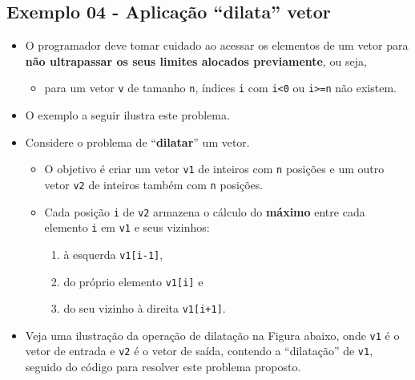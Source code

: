\documentclass[12pt,a4paper]{article}
\providecommand{\tightlist}{%
      \setlength{\itemsep}{0pt}\setlength{\parskip}{0pt}}
\begin{document}
    \hypertarget{exemplo-04---aplicauxe7uxe3o-dilata-vetor}{%
\subsection{Exemplo 04 - Aplicação ``dilata''
vetor}\label{exemplo-04---aplicauxe7uxe3o-dilata-vetor}}

\begin{itemize}
\item
  O programador deve tomar cuidado ao acessar os elementos de um vetor
  para \textbf{não ultrapassar os seus limites alocados previamente}, ou
  seja,

  \begin{itemize}
  \tightlist
  \item
    para um vetor \texttt{v} de tamanho \texttt{n}, índices \texttt{i}
    com \texttt{i\textless{}0} ou \texttt{i\textgreater{}=n} não
    existem.
  \end{itemize}
\item
  O exemplo a seguir ilustra este problema.
\item
  Considere o problema de ``\textbf{dilatar}'' um vetor.

  \begin{itemize}
  \tightlist
  \item
    O objetivo é criar um vetor \texttt{v1} de inteiros com \texttt{n}
    posições e um outro vetor \texttt{v2} de inteiros também com
    \texttt{n} posições.
  \item
    Cada posição \texttt{i} de \texttt{v2} armazena o cálculo do
    \textbf{máximo} entre cada elemento \texttt{i} em \texttt{v1} e seus
    vizinhos:

    \begin{enumerate}
    \def\labelenumi{\arabic{enumi}.}
    \tightlist
    \item
      à esquerda \texttt{v1{[}i-1{]}},
    \item
      do próprio elemento \texttt{v1{[}i{]}} e
    \item
      do seu vizinho à direita \texttt{v1{[}i+1{]}}.
    \end{enumerate}
  \end{itemize}
\item
  Veja uma ilustração da operação de dilatação na Figura abaixo, onde
  \texttt{v1} é o vetor de entrada e \texttt{v2} é o vetor de saída,
  contendo a ``dilatação'' de \texttt{v1}, seguido do código para
  resolver este problema proposto.
\end{itemize}
\end{document}

